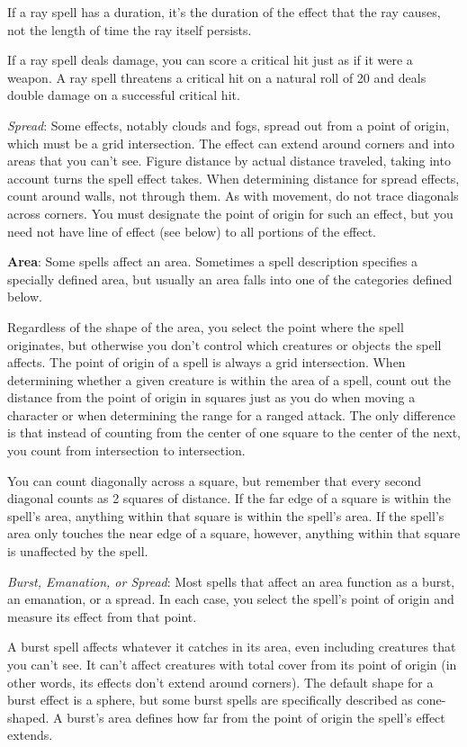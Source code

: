 If a ray spell has a duration, it's the duration of the effect that the ray causes, not the length of time the ray itself persists.

If a ray spell deals damage, you can score a critical hit just as if it were a weapon. A ray spell threatens a critical hit on a natural roll of 20 and deals double damage on a successful critical hit.

\textit{Spread}: Some effects, notably clouds and fogs, spread out from a point of origin, which must be a grid intersection. The effect can extend around corners and into areas that you can't see. Figure distance by actual distance traveled, taking into account turns the spell effect takes. When determining distance for spread effects, count around walls, not through them. As with movement, do not trace diagonals across corners. You must designate the point of origin for such an effect, but you need not have line of effect (see below) to all portions of the effect.

\textbf{Area}: Some spells affect an area. Sometimes a spell description specifies a specially defined area, but usually an area falls into one of the categories defined below.

Regardless of the shape of the area, you select the point where the spell originates, but otherwise you don't control which creatures or objects the spell affects. The point of origin of a spell is always a grid intersection. When determining whether a given creature is within the area of a spell, count out the distance from the point of origin in squares just as you do when moving a character or when determining the range for a ranged attack. The only difference is that instead of counting from the center of one square to the center of the next, you count from intersection to intersection.

You can count diagonally across a square, but remember that every second diagonal counts as 2 squares of distance. If the far edge of a square is within the spell's area, anything within that square is within the spell's area. If the spell's area only touches the near edge of a square, however, anything within that square is unaffected by the spell.

\textit{Burst, Emanation, or Spread}: Most spells that affect an area function as a burst, an emanation, or a spread. In each case, you select the spell's point of origin and measure its effect from that point.

A burst spell affects whatever it catches in its area, even including creatures that you can't see. It can't affect creatures with total cover from its point of origin (in other words, its effects don't extend around corners). The default shape for a burst effect is a sphere, but some burst spells are specifically described as cone-shaped. A burst's area defines how far from the point of origin the spell's effect extends.

